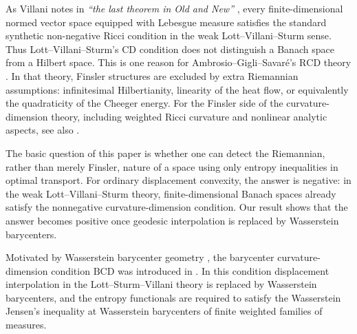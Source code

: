 \documentclass[a4paper,11pt]{article}
\numberwithin{equation}{section}
\begin{document}
	As Villani notes in \emph{``the last theorem in Old and New''} \cite[p.~926]{Villani2009}, every finite-dimensional normed vector space equipped with Lebesgue measure satisfies the standard synthetic non-negative Ricci condition in the weak Lott--Villani--Sturm sense. Thus  Lott--Villani--Sturm's $\mathrm{CD}$ condition  does not distinguish a Banach space from a Hilbert space. This is one reason for Ambrosio--Gigli--Savar\'e's \(\mathrm{RCD}\) theory \cite{AGS14,Gigli}. In that theory, Finsler structures are excluded by extra Riemannian assumptions: infinitesimal Hilbertianity, linearity of the heat flow, or equivalently the quadraticity of the Cheeger energy. For the Finsler side of the curvature-dimension theory, including weighted Ricci curvature and nonlinear analytic aspects, see also \cite{Ohta,Ohta2014,Ohta2017Survey,OhtaSturm2014}.
	
	\medskip
	The basic question of this paper is whether one can detect the
Riemannian, rather than merely Finsler, nature of a space using only
entropy inequalities in optimal transport.
For ordinary displacement convexity, the answer is negative: in the weak
Lott--Villani--Sturm theory, finite-dimensional Banach spaces already satisfy
the nonnegative curvature-dimension condition. Our result shows that the
answer becomes positive once geodesic interpolation is replaced by
Wasserstein barycenters.


	Motivated by Wasserstein barycenter geometry \cite{AguehCarlier,KimPass}, the barycenter curvature-dimension condition \(\mathrm{BCD}\) was introduced in \cite{HanLiuZhuBCD,HanLiuZhuSurvey}. In this condition displacement interpolation in the Lott--Sturm--Villani theory is replaced by Wasserstein barycenters, and the entropy functionals are required to satisfy the Wasserstein Jensen's inequality at Wasserstein barycenters of finite weighted families of measures.
	
	
	
\end{document}

